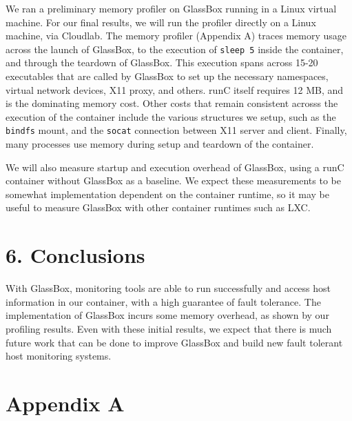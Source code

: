 \documentclass{proc}
\begin{document}
We ran a preliminary memory profiler on GlassBox running in a Linux virtual machine. For our final results, we will run the profiler directly on a Linux machine, via Cloudlab. The memory profiler (Appendix A) traces memory usage across the launch of GlassBox, to the execution of \texttt{sleep 5} inside the container, and through the teardown of GlassBox. This execution spans across 15-20 executables that are called by GlassBox to set up the necessary namespaces, virtual network devices, X11 proxy, and others. runC itself requires 12 MB, and is the dominating memory cost. Other costs that remain consistent acrosss the execution of the container include the various structures we setup, such as the \texttt{bindfs} mount, and the \texttt{socat} connection between X11 server and client. Finally, many processes use memory during setup and teardown of the container.

We will also measure startup and execution overhead of GlassBox, using a runC container without GlassBox as a baseline. We expect these measurements to be somewhat implementation dependent on the container runtime, so it may be useful to measure GlassBox with other container runtimes such as LXC.

\section*{6. Conclusions}

With GlassBox, monitoring tools are able to run successfully and access host information in our container, with a high guarantee of fault tolerance. The implementation of GlassBox incurs some memory overhead, as shown by our profiling results. Even with these initial results, we expect that there is much future work that can be done to improve GlassBox and build new fault tolerant host monitoring systems.




\clearpage

\section*{Appendix A}

\end{document}
